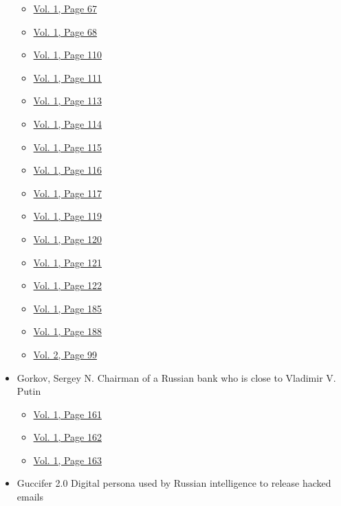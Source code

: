 \begin{itemize}
  \begin{itemize}
  \tightlist
  \item
    \protect\hyperlink{g-page-75}{Vol. 1, Page 67}
  \item
    \protect\hyperlink{g-page-76}{Vol. 1, Page 68}
  \item
    \protect\hyperlink{g-page-118}{Vol. 1, Page 110}
  \item
    \protect\hyperlink{g-page-119}{Vol. 1, Page 111}
  \item
    \protect\hyperlink{g-page-121}{Vol. 1, Page 113}
  \item
    \protect\hyperlink{g-page-122}{Vol. 1, Page 114}
  \item
    \protect\hyperlink{g-page-123}{Vol. 1, Page 115}
  \item
    \protect\hyperlink{g-page-124}{Vol. 1, Page 116}
  \item
    \protect\hyperlink{g-page-125}{Vol. 1, Page 117}
  \item
    \protect\hyperlink{g-page-127}{Vol. 1, Page 119}
  \item
    \protect\hyperlink{g-page-128}{Vol. 1, Page 120}
  \item
    \protect\hyperlink{g-page-129}{Vol. 1, Page 121}
  \item
    \protect\hyperlink{g-page-130}{Vol. 1, Page 122}
  \item
    \protect\hyperlink{g-page-193}{Vol. 1, Page 185}
  \item
    \protect\hyperlink{g-page-196}{Vol. 1, Page 188}
  \item
    \protect\hyperlink{g-page-311}{Vol. 2, Page 99}
  \end{itemize}
\item
  Gorkov, Sergey N. Chairman of a Russian bank who is close to Vladimir
  V. Putin

  \begin{itemize}
  \tightlist
  \item
    \protect\hyperlink{g-page-169}{Vol. 1, Page 161}
  \item
    \protect\hyperlink{g-page-170}{Vol. 1, Page 162}
  \item
    \protect\hyperlink{g-page-171}{Vol. 1, Page 163}
  \end{itemize}
\item
  Guccifer 2.0 Digital persona used by Russian intelligence to release
  hacked emails


\end{itemize}

